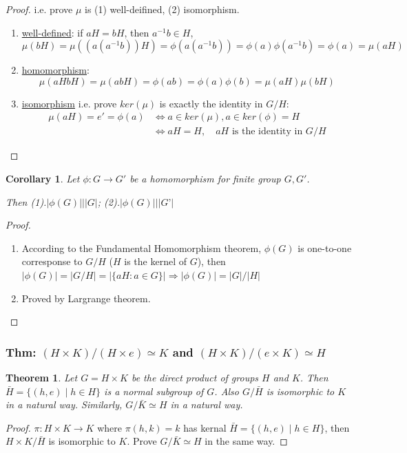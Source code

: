 \documentclass[11pt,a4paper]{article}
\newtheorem{theorem}{Theorem}
\newtheorem{corollary}{Corollary}
\begin{document}
\begin{proof}
i.e. prove $\mu$ is (1) well-deifined, (2) isomorphism.
\begin{enumerate}[(1)]
    \item \underline{well-defined}: if $aH=bH$, then $a^{-1}b\in H$, $$\mu(bH)=\mu((a(a^{-1}b))H)=\phi(a(a^{-1}b))=\phi(a)\phi(a^{-1}b)=\phi(a)=\mu(aH)$$
    \item \underline{homomorphism}:$$\mu(aHbH)=\mu(abH)=\phi(ab)=\phi(a)\phi(b)=\mu(aH)\mu(bH)$$
    \item \underline{isomorphism} i.e. prove $ker(\mu)$ is exactly the identity in $G/H$:
    \begin{equation}
        \begin{aligned}
            \mu(aH)=e'=\phi(a) & \Leftrightarrow a\in ker(\mu),a\in ker(\phi)=H\\
            &\Leftrightarrow aH=H,\quad aH\text{ is the identity in }G/H
        \end{aligned}
        \nonumber
    \end{equation}
\end{enumerate}
\end{proof}

\begin{corollary}
Let $\phi: G \rightarrow G'$ be a homomorphism for finite group $G,G'$.

Then (1).$|\phi(G)|\bigg|  |G|$; (2).$|\phi(G)|\bigg|  |G’|$
\end{corollary}
\begin{proof}
\quad
\begin{enumerate}[(1)]
    \item According to the Fundamental Homomorphism theorem, $\phi(G)$ is one-to-one corresponse to $G/H$ ($H$ is the kernel of $G$), then $|\phi(G)|=|G/H|=|\{aH: a\in G\}| \Rightarrow|\phi(G)|=|G|/|H|$
    \item Proved by Largrange theorem.
\end{enumerate}
\end{proof}

\subsubsection{Thm: $(H\times K)/(H\times e)\simeq K$ and $(H\times K)/(e\times K)\simeq H$}
\begin{theorem}
    Let $G=H \times K$ be the direct product of groups $H$ and $K$. Then $\bar{H}=\{(h, e) \mid h \in H\}$ is a normal subgroup of $G$. Also $G / \bar{H}$ is isomorphic to $K$ in a natural way. Similarly, $G / \bar{K} \simeq H$ in a natural way.
\end{theorem}
\begin{proof}
    $\pi:H\times K \rightarrow	K$ where $\pi(h,k)=k$ has kernal $\bar{H}=\{(h, e) \mid h \in H\}$, then $H\times K/\bar{H}$ is isomorphic to $K$. Prove $G / \bar{K} \simeq H$ in the same way.
\end{proof}
\end{document}
